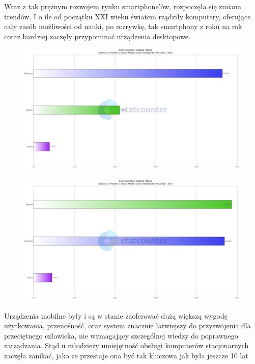 \documentclass[12pt, a4paper]{article}
\begin{document}
\begin{sloppypar}
{{    Wraz z tak prężnym rozwojem rynku smartphone'ów, rozpoczęła się zmiana trendów.
    I o ile od początku XXI wieku światem rządziły komputery, oferujące cały zasób 
    możliwości od nauki, po rozrywkę, tak smartphony z roku na rok coraz bardziej 
    zaczęły przypominać urządzenia desktopowe. 
    \begin{figure}[H]
      \centering
      \includegraphics[width=.9\textwidth]{systems_chart1.png}
      \label{fig:2013}
    \end{figure} 
    \begin{figure}[H]
      \centering
      \includegraphics[width=.9\textwidth]{systems_chart2.png}
      \label{fig:2016}
    \end{figure} 
    Urządzenia mobilne były i są w stanie zaoferować dużą większą wygodę 
    użytkowania, przenośność, oraz system znacznie łatwiejszy do przyswojenia dla 
    przeciętnego człowieka, nie wymagający szczególnej wiedzy do poprawnego
    zarządzania. Stąd u młodzieży umiejętność obsługi komputerów stacjonarnych
    zaczęła zanikać, jako że przestaje ona być tak kluczowa jak była jeszcze 10 lat
}}
\end{sloppypar}
\end{document}
